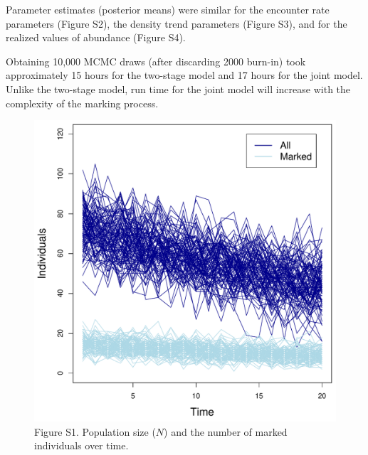 \documentclass[12pt]{article}
\begin{document}
Parameter estimates (posterior means) were similar for the
encounter rate parameters (Figure S2), the density trend
parameters (Figure S3), and for the realized values of abundance
(Figure S4). 

Obtaining 10,000 MCMC draws (after discarding 2000 burn-in) took
approximately 15 hours for the two-stage model and 17 hours for the
joint model. Unlike the two-stage model, run time for the joint model
will increase with the complexity of the marking process.


\clearpage

\begin{figure}[h!]
  \centering
  \includegraphics[width=\textwidth]{sim/sim-N-n}
  \caption{Figure S1. Population size ($N$) and the number of marked
    individuals over time. }   
  \label{fig:sim-N-n}
\end{figure}



\clearpage
\end{document}
